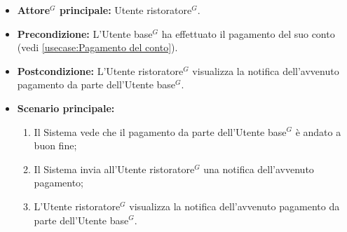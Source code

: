 \label{usecase:Visualizzazione notifica di avvenuto pagamento}
\begin{itemize}
	\item \textbf{\gls{Attore}$^G$ principale:} \gls{Utente ristoratore}$^G$.

	\item \textbf{Precondizione:} L'\gls{Utente base}$^G$ ha effettuato il pagamento del suo conto (vedi \autoref{usecase:Pagamento del conto}).


	\item \textbf{Postcondizione:} L'\gls{Utente ristoratore}$^G$ visualizza la notifica
		dell'avvenuto pagamento da parte dell'\gls{Utente base}$^G$.

	\item \textbf{Scenario principale:}
	      \begin{enumerate}
		      \item Il Sistema vede che il pagamento da parte dell'\gls{Utente base}$^G$ è andato a buon fine;
		      \item Il Sistema invia all'\gls{Utente ristoratore}$^G$ una notifica dell'avvenuto pagamento;
		      \item L'\gls{Utente ristoratore}$^G$ visualizza la notifica dell'avvenuto
		            pagamento da parte dell'\gls{Utente base}$^G$.
	      \end{enumerate}
\end{itemize}
